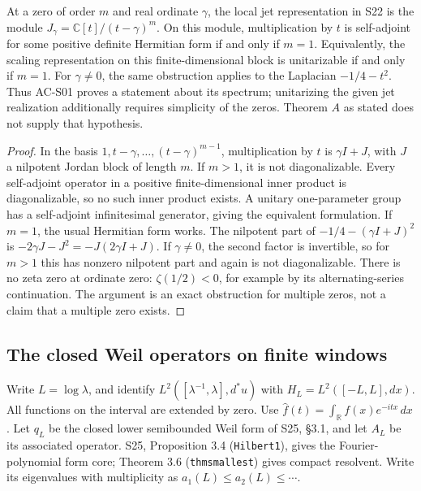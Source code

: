 \begin{proposition}
\label{AC-S02}
At a zero of order \(m\) and real ordinate \(\gamma\), the local jet
representation in S22 is the module
\(J_\gamma=\mathbb C[t]/(t-\gamma)^m\).  On this module, multiplication
by \(t\) is self-adjoint for some positive definite Hermitian form if
and only if \(m=1\).  Equivalently, the scaling representation on this
finite-dimensional block is unitarizable if and only if \(m=1\).
For \(\gamma\ne0\), the same obstruction applies to the Laplacian
\(-1/4-t^2\).  Thus AC-S01 proves a statement about its spectrum;
unitarizing the given jet realization additionally requires simplicity
of the zeros.  Theorem \(A\) as stated does not supply that hypothesis.
\end{proposition}
\begin{proof}
In the basis \(1,t-\gamma,\ldots,(t-\gamma)^{m-1}\), multiplication
by \(t\) is \(\gamma I+J\), with \(J\) a nilpotent Jordan block of
length \(m\).  If \(m>1\), it is not diagonalizable.  Every
self-adjoint operator in a positive finite-dimensional inner product is
diagonalizable, so no such inner product exists.  A unitary one-parameter
group has a self-adjoint infinitesimal generator, giving the equivalent
formulation.  If \(m=1\), the usual Hermitian form works.  The
nilpotent part of \(-1/4-(\gamma I+J)^2\) is
\(-2\gamma J-J^2=-J(2\gamma I+J)\).  If \(\gamma\ne0\), the
second factor is invertible, so for \(m>1\) this has nonzero nilpotent
part and again is not diagonalizable.  There is no zeta zero at ordinate
zero: \(\zeta(1/2)<0\), for example by its alternating-series
continuation.  The argument is an exact obstruction for multiple zeros,
not a claim that a multiple zero exists.
\end{proof}

\subsection{The closed Weil operators on finite windows}

Write \(L=\log\lambda\), and identify
\(L^2([\lambda^{-1},\lambda],d^*u)\) with
\(H_L=L^2([-L,L],dx)\).  All functions on the interval are extended by
zero.  Use
\(\widehat f(t)=\int_{\mathbb R}f(x)e^{-itx}\,dx\).
Let \(q_L\) be the closed lower semibounded Weil form of S25,
\S3.1, and let \(A_L\) be its associated operator.
S25, Proposition 3.4 (\texttt{Hilbert1}), gives the Fourier-polynomial
form core; Theorem 3.6 (\texttt{thmsmallest}) gives compact resolvent.
Write its eigenvalues with multiplicity as
\(a_1(L)\leq a_2(L)\leq\cdots\).

